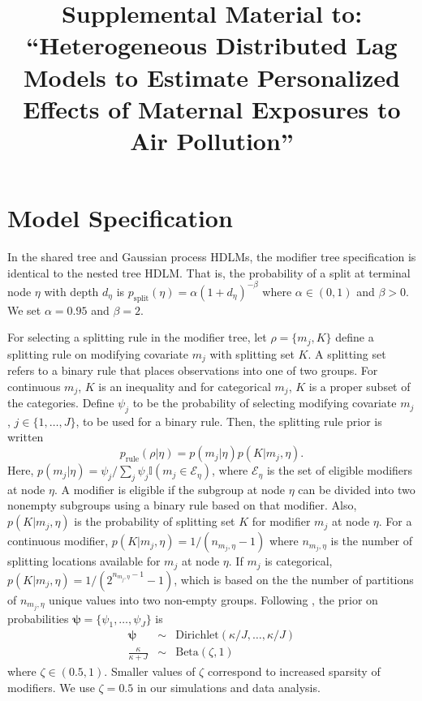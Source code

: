 \documentclass[12pt]{article}
\begin{document}
\title{Supplemental Material to:\\
``Heterogeneous Distributed Lag Models to Estimate Personalized Effects of Maternal Exposures to Air Pollution''}
\date{}

\maketitle
{}


\section{Model Specification} \label{sec:mod-spec}
In the shared tree and Gaussian process HDLMs, the modifier tree specification is identical to the nested tree HDLM. That is, the probability of a split at terminal node $\eta$ with depth $d_\eta$ is $p_{\text{split}}(\eta)=\alpha(1+d_\eta)^{-\beta}$ where $\alpha\in(0,1)$ and $\beta>0$. We set $\alpha=0.95$ and $\beta=2$.

For selecting a splitting rule in the modifier tree, let $\rho=\{m_j,K\}$ define a splitting rule on modifying covariate $m_j$ with splitting set $K$. A splitting set refers to a binary rule that places observations into one of two groups. For continuous $m_j$, $K$ is an inequality and for categorical $m_j$, $K$ is a proper subset of the categories. Define $\psi_j$ to be the probability of selecting modifying covariate $m_j$, $j\in\{1,\ldots,J\}$, to be used for a binary rule. Then, the splitting rule prior is written
\begin{equation}
    p_{\text{rule}}(\rho|\eta)=p(m_j|\eta)p(K|m_j,\eta).
\end{equation}
Here, $p(m_j|\eta)=\psi_j/\sum_j\psi_j\mathbb{I}(m_j\in\mathcal{E}_\eta)$, where $\mathcal{E}_\eta$ is the set of eligible modifiers at node $\eta$. A modifier is eligible if the subgroup at node $\eta$ can be divided into two nonempty subgroups using a binary rule based on that modifier. Also, $p(K|m_j,\eta)$ is the probability of splitting set $K$ for modifier $m_j$ at node $\eta$. For a continuous modifier, $p(K|m_j,\eta)=1\big/(n_{m_j,\eta}-1)$ where $n_{m_j,\eta}$ is the number of splitting locations available for $m_j$ at node $\eta$. If $m_j$ is categorical, $p(K|m_j,\eta)=1\big/(2^{n_{m_j,\eta}-1}-1)$, which is based on the the number of partitions of $n_{m_j,\eta}$ unique values into two non-empty groups. Following \cite{Linero2018}, the prior on probabilities $\boldsymbol\psi=\{\psi_1,\ldots,\psi_J\}$ is
\begin{eqnarray}
    \boldsymbol\psi&\sim&\text{Dirichlet}(\kappa/J,\ldots,\kappa/J)\\
    \frac{\kappa}{\kappa+J}&\sim&\text{Beta}(\zeta,1)
\end{eqnarray}
where $\zeta\in(0.5,1)$. Smaller values of $\zeta$ correspond to increased sparsity of modifiers. We use $\zeta=0.5$ in our simulations and data analysis.
\end{document}

